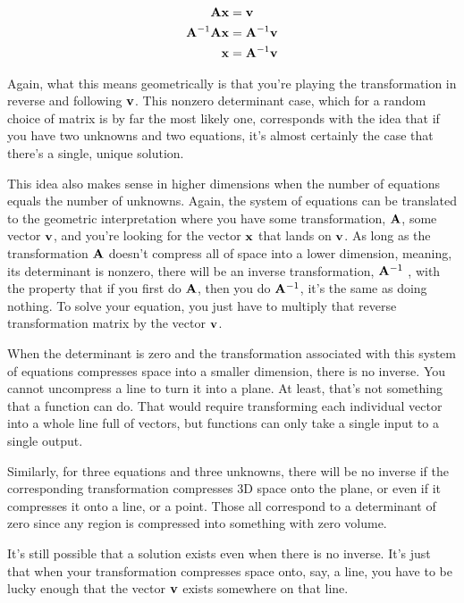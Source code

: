 \begin{align*}
  \mathbf{A}\mathbf{x} &= \mathbf{v} \\
  \mathbf{A}^{-1}\mathbf{A}\mathbf{x} &= \mathbf{A}^{-1}\mathbf{v} \\
  \mathbf{x} &= \mathbf{A}^{-1}\mathbf{v}
\end{align*}

Again, what this means geometrically is that you're playing the transformation
in reverse and following $\mathbf{v}$. This nonzero determinant case, which for a
random choice of matrix is by far the most likely one, corresponds with the idea
that if you have two unknowns and two equations, it's almost certainly the case
that there's a single, unique solution.

This idea also makes sense in higher dimensions when the number of equations
equals the number of unknowns. Again, the system of equations can be translated
to the geometric interpretation where you have some transformation, $\mathbf{A}$,
some vector $\mathbf{v}$, and you're looking for the vector $\mathbf{x}$ that lands on
$\mathbf{v}$. As long as the transformation $\mathbf{A}$ doesn't compress all of
space into a lower dimension, meaning, its determinant is nonzero, there will be
an inverse transformation, $\mathbf{A}^{-1}$ , with the property that if you first
do $\mathbf{A}$, then you do $\mathbf{A}^{-1}$, it's the same as doing nothing. To
solve your equation, you just have to multiply that reverse transformation
matrix by the vector $\mathbf{v}$.

When the determinant is zero and the transformation associated with this system
of equations compresses space into a smaller dimension, there is no inverse. You
cannot uncompress a line to turn it into a plane. At least, that's not something
that a function can do. That would require transforming each individual vector
into a whole line full of vectors, but functions can only take a single input to
a single output.

Similarly, for three equations and three unknowns, there will be no inverse if
the corresponding transformation compresses 3D space onto the plane, or even if
it compresses it onto a line, or a point. Those all correspond to a determinant
of zero since any region is compressed into something with zero volume.

It's still possible that a solution exists even when there is no inverse. It's
just that when your transformation compresses space onto, say, a line, you have
to be lucky enough that the vector $\mathbf{v}$ exists somewhere on that line.

